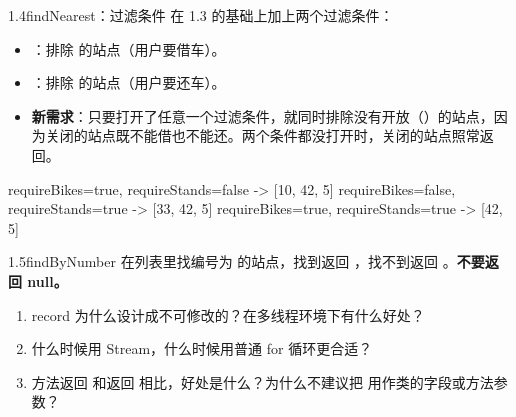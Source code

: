 \begin{task}{1.4\quad findNearest：过滤条件}
在 1.3 的基础上加上两个过滤条件：
\begin{itemize}
  \item {}：排除  的站点（用户要借车）。
  \item {}：排除  的站点（用户要还车）。
  \item \textbf{新需求}：只要打开了任意一个过滤条件，就同时排除没有开放（）的站点，因为关闭的站点既不能借也不能还。两个条件都没打开时，关闭的站点照常返回。
\end{itemize}

\begin{example}[Example（同样的 5 个站点，limit = 10）]
\begin{plaincode}
requireBikes=true,  requireStands=false  ->  [10, 42, 5]
requireBikes=false, requireStands=true   ->  [33, 42, 5]
requireBikes=true,  requireStands=true   ->  [42, 5]
\end{plaincode}
\end{example}
\end{task}

\begin{task}{1.5\quad findByNumber}
在列表里找编号为  的站点，找到返回 ，找不到返回 。\textbf{不要返回 null。}
\end{task}

\begin{think}
\begin{enumerate}
  \item record 为什么设计成不可修改的？在多线程环境下有什么好处？
  \item 什么时候用 Stream，什么时候用普通 for 循环更合适？
  \item 方法返回  和返回  相比，好处是什么？为什么不建议把  用作类的字段或方法参数？
\end{enumerate}
\end{think}
